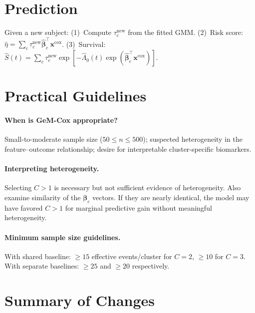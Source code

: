 \documentclass[11pt]{article}
\newcommand{\bx}{\mathbf{x}}
\newcommand{\bbeta}{\boldsymbol{\beta}}
\newenvironment{revblock}{\color{revcolor}}{}
\begin{document}
\section{Prediction}

Given a new subject: (1)~Compute $\tau_c^{\mathrm{new}}$ from the fitted GMM. (2)~Risk score: $\hat{\eta} = \sum_c \tau_c^{\mathrm{new}}\hat{\bbeta}_c^\top\bx^{\mathrm{cox}}$. (3)~Survival: $\hat{S}(t) = \sum_c \tau_c^{\mathrm{new}}\exp[-\hat{\Lambda}_0(t)\exp(\hat{\bbeta}_c^\top\bx^{\mathrm{cox}})]$.


\begin{revblock}
\section{Practical Guidelines}

\paragraph{When is GeM-Cox appropriate?}
Small-to-moderate sample size ($50 \le n \le 500$); suspected heterogeneity in the feature--outcome relationship; desire for interpretable cluster-specific biomarkers.

\paragraph{Interpreting heterogeneity.}
Selecting $C>1$ is necessary but not sufficient evidence of heterogeneity. Also examine similarity of the $\bbeta_c$ vectors. If they are nearly identical, the model may have favored $C>1$ for marginal predictive gain without meaningful heterogeneity.

\paragraph{Minimum sample size guidelines.}
With shared baseline: ${\ge}15$ effective events/cluster for $C\!=\!2$, ${\ge}10$ for $C\!=\!3$. With separate baselines: ${\ge}25$ and ${\ge}20$ respectively.
\end{revblock}


\section{Summary of Changes}
\end{document}
